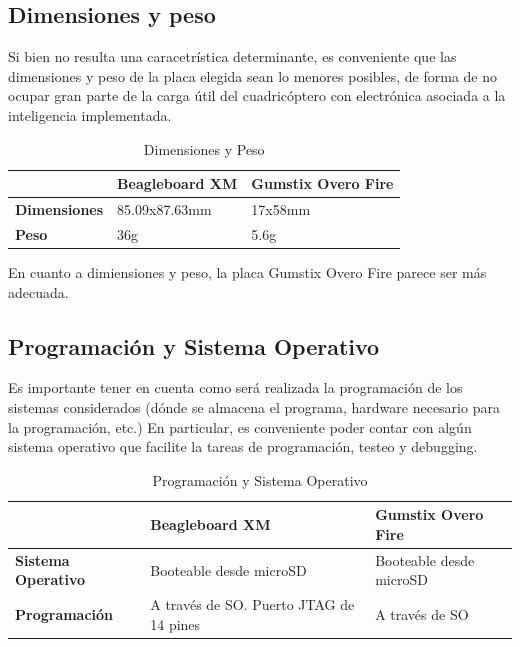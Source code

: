 \documentclass[main]{subfiles}
\begin{document}
\subsection*{Dimensiones y peso}

Si bien no resulta una caracetr\'istica determinante, es conveniente que las dimensiones y peso de la placa elegida sean lo menores posibles, de forma de no ocupar gran parte de la carga \'util del cuadric\'optero con electr\'onica asociada a la inteligencia implementada.\\

\begin{table}[H]
\begin{tabular}{p{130pt}|p{130pt}|p{130pt}|} 
\cline{2-3}
& \cellcolor[gray]{0.8} \textbf{Beagleboard XM} 
& \cellcolor[gray]{0.8} \textbf{Gumstix Overo Fire} \\ \cline{1-3} \hline
\multicolumn{1}{|p{130pt}|}{\cellcolor[gray]{0.8}\textbf{Dimensiones}} 
&85.09x87.63mm &17x58mm\\ 
\hline 
\multicolumn{1}{|p{130pt}|}{\cellcolor[gray]{0.8}\textbf{Peso}} 
&36g &5.6g\\
\hline
\end{tabular}
\caption{Dimensiones y Peso}
\label{tab:dim}
\end{table}
En cuanto a dimiensiones y peso, la placa Gumstix Overo Fire parece ser m\'as adecuada.

\subsection*{Programaci\'on y Sistema Operativo}

Es importante tener en cuenta como ser\'a realizada la programaci\'on de los sistemas considerados (d\'onde se almacena el programa, hardware necesario para la programaci\'on, etc.) En particular, es conveniente poder contar con alg\'un sistema operativo que facilite la tareas de programaci\'on, testeo y debugging.

\begin{table}[H]
\begin{tabular}{p{130pt}|p{130pt}|p{130pt}|} 
\cline{2-3}
& \cellcolor[gray]{0.8} \textbf{Beagleboard XM} 
& \cellcolor[gray]{0.8} \textbf{Gumstix Overo Fire} \\ \cline{1-3} \hline
\multicolumn{1}{|p{130pt}|}{\cellcolor[gray]{0.8}\textbf{Sistema Operativo}} 
&Booteable desde microSD &Booteable desde microSD\\ 
\hline 
\multicolumn{1}{|p{130pt}|}{\cellcolor[gray]{0.8}\textbf{Programaci\'on}} 
&A trav\'es de SO. Puerto JTAG de 14 pines &A trav\'es de SO\\
\hline
\end{tabular}
\caption{Programaci\'on y Sistema Operativo}
\label{tab:prog}
\end{table}
\end{document}
